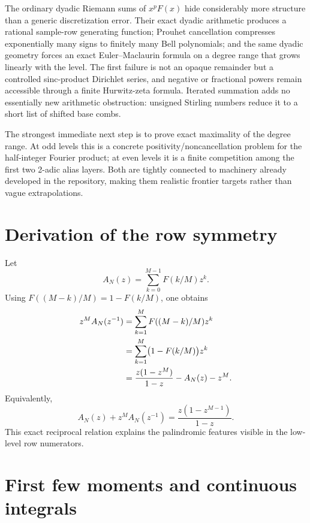 \documentclass[11pt,oneside]{article}
\numberwithin{equation}{section}
\theoremstyle{definition}
\theoremstyle{remark}
\begin{document}
The ordinary dyadic Riemann sums of \(x^pF(x)\) hide considerably more structure than a
generic discretization error.  Their exact dyadic arithmetic produces a rational
sample-row generating function; Prouhet cancellation compresses exponentially many signs
to finitely many Bell polynomials; and the same dyadic geometry forces an exact
Euler--Maclaurin formula on a degree range that grows linearly with the level.  The first
failure is not an opaque remainder but a controlled sinc-product Dirichlet series, and
negative or fractional powers remain accessible through a finite Hurwitz-zeta formula.
Iterated summation adds no essentially new arithmetic obstruction: unsigned Stirling
numbers reduce it to a short list of shifted base combs.

The strongest immediate next step is to prove exact maximality of the degree range.  At
odd levels this is a concrete positivity/noncancellation problem for the half-integer
Fourier product; at even levels it is a finite competition among the first two 2-adic
alias layers.  Both are tightly connected to machinery already developed in the
repository, making them realistic frontier targets rather than vague extrapolations.

\appendix

\section{Derivation of the row symmetry}
\label{app:row-symmetry}

Let
\begin{equation}
 A_N(z)=\sum_{k=0}^{M-1}F(k/M)z^k.
\end{equation}
Using \(F((M-k)/M)=1-F(k/M)\), one obtains
\begin{align}
 z^MA_N(z^{-1})
 &=\sum_{k=1}^{M}F((M-k)/M)z^k
 \notag\\
 &=\sum_{k=1}^{M}\bigl(1-F(k/M)\bigr)z^k
 \notag\\
 &=\frac{z(1-z^M)}{1-z}-A_N(z)-z^M.
 \label{eq:AN-reciprocal}
\end{align}
Equivalently,
\begin{equation}
 A_N(z)+z^MA_N(z^{-1})
 =\frac{z(1-z^{M-1})}{1-z}.
 \label{eq:AN-reciprocal-clean}
\end{equation}
This exact reciprocal relation explains the palindromic features visible in the low-level
row numerators.

\section{First few moments and continuous integrals}
\label{app:moments}
\end{document}

